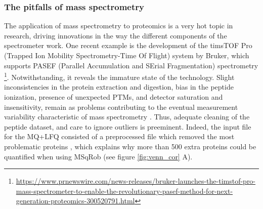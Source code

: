\documentclass[11pt, a4paper]{report}
\makeatletter
\DeclarePairedDelimiter\abs{\lvert}{\rvert}%
\let\oldabs\abs
\def\abs{\@ifstar{\oldabs}{\oldabs*}}
\makeatother
\begin{document}
%
%
%
%
%


\subsubsection{The pitfalls of mass spectrometry}

The application of mass spectrometry to proteomics is a very hot topic in research, driving innovations in the way the different components of the spectrometer work. One recent example is the development of the timsTOF\texttrademark\xspace Pro (Trapped Ion Mobility Spectrometry-Time Of Flight) system by Bruker, which supports PASEF (Parallel Accumulation and SErial Fragmentation) spectrometry \footnote{\href{https://www.prnewswire.com/news-releases/bruker-launches-the-timstof-pro-mass-spectrometer-to-enable-the-revolutionary-pasef-method-for-next-generation-proteomics-300520791.html}{https://www.prnewswire.com/news-releases/bruker-launches-the-timstof-pro-mass-spectrometer-to-enable-the-revolutionary-pasef-method-for-next-generation-proteomics-300520791.html}}. Notwithstanding, it reveals the immature state of the technology. Slight inconsistencies in the protein extraction and digestion, bias in the peptide ionization, presence of unexpected PTMs, and detector saturation and insensitivity, remain as problems contributing to the eventual measurement variability characteristic of mass spectrometry \cite{Piehowski2013}. Thus, adequate cleaning of the peptide dataset, and care to ignore outliers is preeminent. Indeed, the input file for the MQ+LFQ consisted of a preprocessed file which removed the most problematic proteins \cite{Cox2014}, which explains why more than 500 extra proteins could be quantified when using MSqRob (see figure \ref{fig:venn_cor} A).
\end{document}
